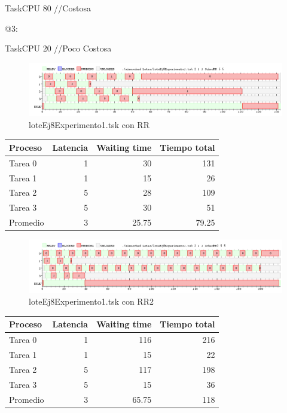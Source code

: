 TaskCPU 80 	//Costosa

@3:

TaskCPU 20 	//Poco Costosa

\begin{figure}[H]
  \centering
    \includegraphics[width=1.1\textwidth]{imagenes/Ej8Experimento1.png}
  \caption{loteEj8Experimento1.tsk con RR}
\end{figure}

\begin{tabular}{l | r | r | r }
  Proceso & Latencia & Waiting time & Tiempo total\\
  \hline
  Tarea 0 & 1 & 30 & 131 \\
  Tarea 1 & 1 & 15 & 26 \\
  Tarea 2 & 5 & 28 &  109\\
  Tarea 3 & 5 & 30 & 51\\
  Promedio & 3 & 25.75 & 79.25\\
\end{tabular}

\begin{figure}[H]
  \centering
    \includegraphics[width=1.1\textwidth]{imagenes/Ej8Experimento2.png}
  \caption{loteEj8Experimento1.tsk con RR2}
\end{figure}

\begin{tabular}{l | r | r | r }
  Proceso & Latencia & Waiting time & Tiempo total\\
  \hline
  Tarea 0 & 1 & 116 &  216\\
  Tarea 1 & 1 & 15 &  22\\
  Tarea 2 & 5 & 117 & 198 \\
  Tarea 3 & 5 & 15 & 36\\
  Promedio & 3 & 65.75 & 118 \\
\end{tabular}

